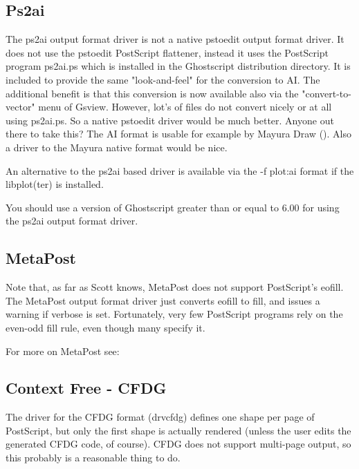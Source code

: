 \documentclass[english,a4paper]{article}
\begin{document}
  \subsection{Ps2ai}

    The ps2ai output format driver is not a native pstoedit output format driver. It does not use the
    pstoedit PostScript flattener, instead it uses the PostScript program
    ps2ai.ps which is installed in the Ghostscript distribution directory. It
    is included to provide the same "look-and-feel" for the conversion to AI.
    The additional benefit is that this conversion is now available also via
    the "convert-to-vector" menu of Gsview. However, lot's of files do not
    convert nicely or at all using ps2ai.ps. So a native pstoedit driver would
    be much better. Anyone out there to take this? The AI format is usable for
    example by Mayura Draw (). Also a driver to the
    Mayura native format would be nice.

    An alternative to the ps2ai based driver is available via the -f plot:ai format if the libplot(ter) is installed.

    You should use a version of Ghostscript greater than or equal to 6.00 for using the ps2ai output format driver.


  \subsection{MetaPost}

    Note that, as far as Scott knows, MetaPost does not support PostScript's
    eofill. The MetaPost output format driver just converts eofill to fill, and issues a warning if
    verbose is set. Fortunately, very few PostScript programs rely on the
    even-odd fill rule, even though many specify it.

    For more on MetaPost see:


  \subsection{Context Free - CFDG}
	The driver for the CFDG format (drvcfdg) defines
	one shape per page of PostScript, but only the first shape is actually
	rendered (unless the user edits the generated CFDG code, of course).
	CFDG does not support multi-page output, so this probably is a reasonable thing to do.
\end{document}
